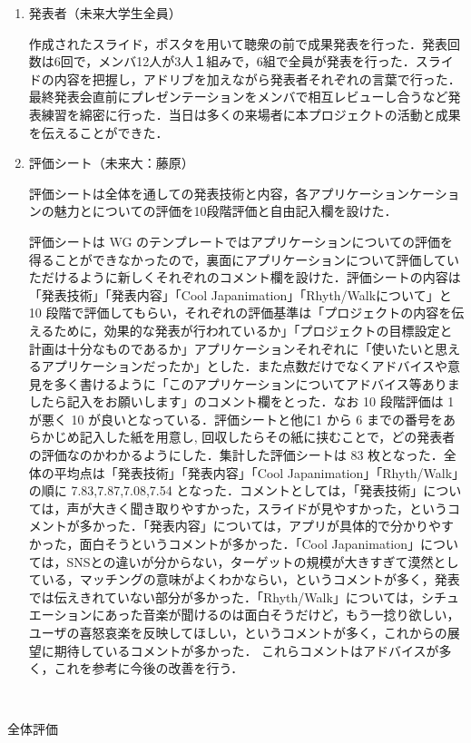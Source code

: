 \begin{enumerate}
\item 発表者（未来大学生全員）
\par
作成されたスライド，ポスタを用いて聴衆の前で成果発表を行った．発表回数は6回で，メンバ12人が3人１組みで，6組で全員が発表を行った．スライドの内容を把握し，アドリブを加えながら発表者それぞれの言葉で行った．最終発表会直前にプレゼンテーションをメンバで相互レビューし合うなど発表練習を綿密に行った．当日は多くの来場者に本プロジェクトの活動と成果を伝えることができた．
\item 評価シート（未来大：藤原）
\par
評価シートは全体を通しての発表技術と内容，各アプリケーションケーションの魅力とについての評価を10段階評価と自由記入欄を設けた．

評価シートは WG のテンプレートではアプリケーションについての評価を得ることができなかったので，裏面にアプリケーションについて評価していただけるように新しくそれぞれのコメント欄を設けた．評価シートの内容は「発表技術」「発表内容」「Cool Japanimation」「Rhyth/Walkについて」と 10 段階で評価してもらい，それぞれの評価基準は「プロジェクトの内容を伝えるために，効果的な発表が行われているか」「プロジェクトの目標設定と計画は十分なものであるか」アプリケーションそれぞれに「使いたいと思えるアプリケーションだったか」とした．また点数だけでなくアドバイスや意見を多く書けるように「このアプリケーションについてアドバイス等ありましたら記入をお願いします」のコメント欄をとった．なお 10 段階評価は 1 が悪く 10 が良いとなっている．評価シートと他に1 から 6 までの番号をあらかじめ記入した紙を用意し, 回収したらその紙に挟むことで，どの発表者の評価なのかわかるようにした．集計した評価シートは 83 枚となった．全体の平均点は「発表技術」「発表内容」「Cool Japanimation」「Rhyth/Walk」の順に 7.83,7.87,7.08,7.54 となった．コメントとしては，「発表技術」については，声が大きく聞き取りやすかった，スライドが見やすかった，というコメントが多かった．「発表内容」については，アプリが具体的で分かりやすかった，面白そうというコメントが多かった．「Cool Japanimation」については，SNSとの違いが分からない，ターゲットの規模が大きすぎて漠然としている，マッチングの意味がよくわかならい，というコメントが多く，発表では伝えきれていない部分が多かった．「Rhyth/Walk」については，シチュエーションにあった音楽が聞けるのは面白そうだけど，もう一捻り欲しい，ユーザの喜怒哀楽を反映してほしい，というコメントが多く，これからの展望に期待しているコメントが多かった．
これらコメントはアドバイスが多く，これを参考に今後の改善を行う．


\end{enumerate}　
\par
全体評価
\par

